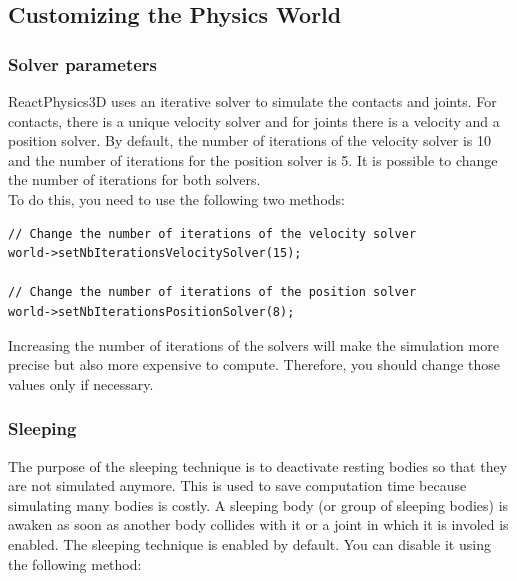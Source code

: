 \documentclass[a4paper,12pt]{article}
\begin{document}
    \subsection{Customizing the Physics World}

    \subsubsection{Solver parameters}

    ReactPhysics3D uses an iterative solver to simulate the contacts and joints. For contacts, there is a unique velocity solver and for
    joints there is a velocity and a position solver. By default, the number of iterations of the velocity solver is 10 and the number of iterations
    for the position solver is 5. It is possible to change the number of iterations for both solvers. \\

    To do this, you need to use the following two methods: \\

    \begin{lstlisting}
// Change the number of iterations of the velocity solver
world->setNbIterationsVelocitySolver(15);

// Change the number of iterations of the position solver
world->setNbIterationsPositionSolver(8);
  \end{lstlisting}

    \vspace{0.6cm}

    Increasing the number of iterations of the solvers will make the simulation more precise but also more expensive to compute. Therefore, you should change
    those values only if necessary.

    \subsubsection{Sleeping}
    \label{sec:sleeping}

    The purpose of the sleeping technique is to deactivate resting bodies so that they are not simulated anymore. This is used to save computation
    time because simulating many bodies is costly. A sleeping body (or group of sleeping bodies) is awaken as soon as another body collides with it or
    a joint in which it is involed is enabled. The sleeping technique is enabled by default. You can disable it using the following method: \\
\end{document}
